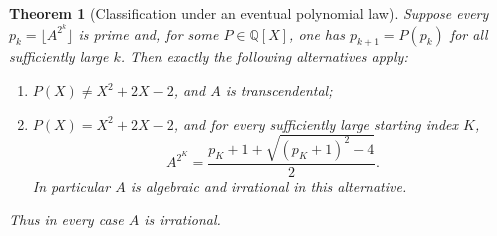 \documentclass[11pt,a4paper]{article}
\newtheorem{theorem}{Theorem}[section]
\theoremstyle{definition}
\theoremstyle{remark}
\numberwithin{equation}{section}
\begin{document}
\begin{theorem}[Classification under an eventual polynomial law]
\label{f13:thm:square-polynomial-exception}
Suppose every $p_k=\lfloor A^{2^k}\rfloor$ is prime and, for some
$P\in\mathbb Q[X]$, one has $p_{k+1}=P(p_k)$ for all sufficiently
large $k$.  Then exactly the following alternatives apply:
\begin{enumerate}
\item $P(X)\ne X^2+2X-2$, and $A$ is transcendental;
\item $P(X)=X^2+2X-2$, and for every sufficiently large starting
index $K$,
\begin{equation}\label{f13:eq:square-polynomial-value}
 A^{2^K}=\frac{p_K+1+\sqrt{(p_K+1)^2-4}}2.
\end{equation}
In particular $A$ is algebraic and irrational in this alternative.
\end{enumerate}
Thus in every case $A$ is irrational.
\end{theorem}
\end{document}

